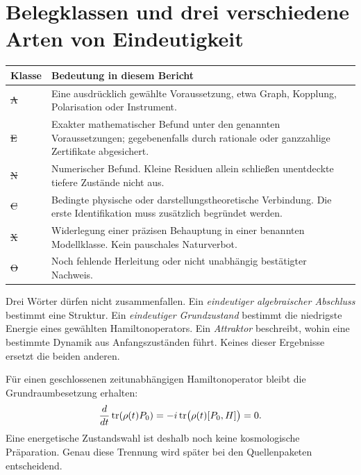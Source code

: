 \section{Belegklassen und drei verschiedene Arten von Eindeutigkeit}
\noindent\begin{tabularx}{\textwidth}{@{}lY@{}}
\toprule
Klasse & Bedeutung in diesem Bericht\\\midrule
\st{A} & Eine ausdrücklich gewählte Voraussetzung, etwa Graph, Kopplung, Polarisation oder Instrument.\\
\st{E} & Exakter mathematischer Befund unter den genannten Voraussetzungen; gegebenenfalls durch rationale oder ganzzahlige Zertifikate abgesichert.\\
\st{N} & Numerischer Befund. Kleine Residuen allein schließen unentdeckte tiefere Zustände nicht aus.\\
\st{C} & Bedingte physische oder darstellungstheoretische Verbindung. Die erste Identifikation muss zusätzlich begründet werden.\\
\st{X} & Widerlegung einer präzisen Behauptung in einer benannten Modellklasse. Kein pauschales Naturverbot.\\
\st{O} & Noch fehlende Herleitung oder nicht unabhängig bestätigter Nachweis.\\\bottomrule
\end{tabularx}

Drei Wörter dürfen nicht zusammenfallen. Ein \emph{eindeutiger algebraischer Abschluss} bestimmt eine Struktur. Ein \emph{eindeutiger Grundzustand} bestimmt die niedrigste Energie eines gewählten Hamiltonoperators. Ein \emph{Attraktor} beschreibt, wohin eine bestimmte Dynamik aus Anfangszuständen führt. Keines dieser Ergebnisse ersetzt die beiden anderen.

Für einen geschlossenen zeitunabhängigen Hamiltonoperator bleibt die Grundraumbesetzung erhalten:
\[
 \frac{d}{dt}\operatorname{tr}(\rho(t)P_0)
 =-i\operatorname{tr}\bigl(\rho(t)[P_0,H]\bigr)=0.
\]
Eine energetische Zustandswahl ist deshalb noch keine kosmologische Präparation. Genau diese Trennung wird später bei den Quellenpaketen entscheidend.

